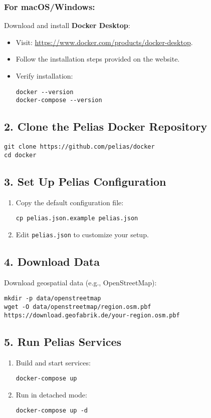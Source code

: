 \documentclass{article}
\begin{document}
\subsubsection*{For macOS/Windows:}
Download and install \textbf{Docker Desktop}:
\begin{itemize}
    \item Visit: \url{https://www.docker.com/products/docker-desktop}.
    \item Follow the installation steps provided on the website.
    \item Verify installation:
    \begin{lstlisting}
docker --version
docker-compose --version
    \end{lstlisting}
\end{itemize}

\subsection*{2. Clone the Pelias Docker Repository}
\begin{lstlisting}
git clone https://github.com/pelias/docker
cd docker
\end{lstlisting}

\subsection*{3. Set Up Pelias Configuration}
\begin{enumerate}
    \item Copy the default configuration file:
    \begin{lstlisting}
cp pelias.json.example pelias.json
    \end{lstlisting}
    \item Edit \texttt{pelias.json} to customize your setup.
\end{enumerate}

\subsection*{4. Download Data}
Download geospatial data (e.g., OpenStreetMap):
\begin{lstlisting}
mkdir -p data/openstreetmap
wget -O data/openstreetmap/region.osm.pbf https://download.geofabrik.de/your-region.osm.pbf
\end{lstlisting}

\subsection*{5. Run Pelias Services}
\begin{enumerate}
    \item Build and start services:
    \begin{lstlisting}
docker-compose up
    \end{lstlisting}
    \item Run in detached mode:
    \begin{lstlisting}
docker-compose up -d
    \end{lstlisting}
\end{enumerate}
\end{document}
